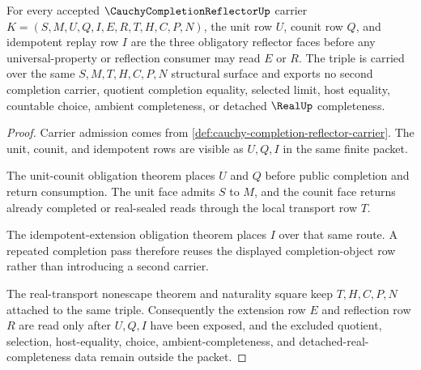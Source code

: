 \begin{theorem}
\label{thm:cauchy-completion-reflector-obligation-triple}
For every accepted $\CauchyCompletionReflectorUp$ carrier $K=(S,M,U,Q,I,E,R,T,H,C,P,N)$, the unit row $U$, counit row $Q$, and idempotent replay row $I$ are the three obligatory reflector faces before any universal-property or reflection consumer may read $E$ or $R$. The triple is carried over the same $S,M,T,H,C,P,N$ structural surface and exports no second completion carrier, quotient completion equality, selected limit, host equality, countable choice, ambient completeness, or detached $\RealUp$ completeness.
\end{theorem}
\begin{proof}
Carrier admission comes from \autoref{def:cauchy-completion-reflector-carrier}. The unit, counit, and idempotent rows are visible as $U,Q,I$ in the same finite packet.

The unit-counit obligation theorem places $U$ and $Q$ before public completion and return consumption. The unit face admits $S$ to $M$, and the counit face returns already completed or real-sealed reads through the local transport row $T$.

The idempotent-extension obligation theorem places $I$ over that same route. A repeated completion pass therefore reuses the displayed completion-object row rather than introducing a second carrier.

The real-transport nonescape theorem and naturality square keep $T,H,C,P,N$ attached to the same triple. Consequently the extension row $E$ and reflection row $R$ are read only after $U,Q,I$ have been exposed, and the excluded quotient, selection, host-equality, choice, ambient-completeness, and detached-real-completeness data remain outside the packet.
\end{proof}

